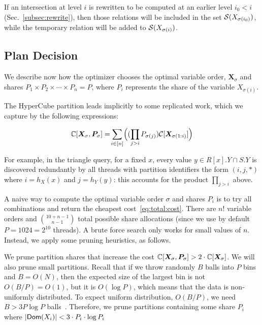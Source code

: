 If an intersection at level $i$ is rewritten to be computed at an
earlier level $i_0<i$ (Sec.~\ref{subsec:rewrite}), then those
relations will be included in the set $\mathcal{S}(X_{\sigma(i_0)})$, while
the temporary relation will be added to $\mathcal{S}(X_{\sigma(i)})$.

\subsection{Plan Decision} \label{subsec:plan}

We describe now how the optimizer chooses the optimal variable order,
$\bm X_\sigma$ and shares $P_1 \times P_2 \times \cdots \times P_n = P$, 
where $P_i$ represents the share of the variable $X_{\sigma(i)}$.

The HyperCube partition leads implicitly to some replicated work,
which we capture by the following expressions:

\begin{equation}
  \Restrict{\TotalCost}{\VTXP, \PartSharePerm} = \smashoperator[lr]{\sum_{i \in [n]}} \Big((\prod_{j > i} P_{\sigma(j)}) \Restrict{\Cost}{\VTXPP{1:i}} \Big)\label{eq:total:cost}
\end{equation}

For example, in the triangle query, for a fixed $x$, every value
$y \in R[x].Y\cap S.Y$ is discovered redundantly by all threads with
partition identifiers the form $(i,j,*)$ where $i=h_X(x)$ and
$j=h_Y(y)$: this accounts for the product $\prod_{j>i}$ above.

A naive way to compute the optimal variable order $\sigma$ and shares
$P_i$ is to try all combinations and return the cheapest
cost~\eqref{eq:total:cost}.  There are $n!$ variable orders and
${10+n-1\choose n-1}$ total possible share allocations (since we use by
default $P=1024=2^{10}$ threads).  A brute force search only works for
small values of $n$.  Instead, we apply some pruning heuristics, as follows.

We prune partition shares that increase the cost
${\mathbb{C}}[{\bm{X}_\sigma, \bm{P}_{\sigma}}] > 2 \cdot
{\ensuremath{\mathbb{C}}}[{\bm{X}_\sigma}]$.  We will also prune small partitions.
Recall that if we throw randomly $B$ balls into $P$ bins and
$B = O(N)$, then the expected size of the largest bin is not
$O(B/P)=O(1)$, but it is $O(\log P)$, which means that the data is
non-uniformly distributed.  To expect uniform distribution, $O(B/P)$,
we need $B > 3 P \log P$ balls~\cite{DBLP:journals/sigmod/KoutrisS16}.
Therefore, we prune partitions containing some share $P_i$ where
$|\textsf{Dom}(X_i)| < 3 \cdot P_i \cdot \log P_i$

